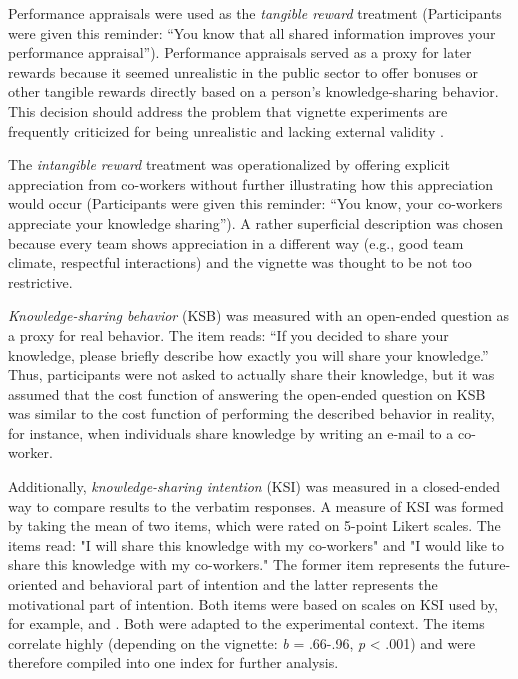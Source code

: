\documentclass{article}
\begin{document}
Performance appraisals were used as the \emph{tangible reward }treatment (Participants were given this reminder: “You know that all shared information improves your performance appraisal”). Performance appraisals served as a proxy for later rewards because it seemed unrealistic in the public sector to offer bonuses or other tangible rewards directly based on a person's knowledge-sharing behavior. This decision should address the problem that vignette experiments are frequently criticized for being unrealistic and lacking external validity \parencite[pp. 361][]{Aguinis2014}.

The \emph{intangible reward} treatment was operationalized by offering explicit appreciation from co-workers without further illustrating how this appreciation would occur (Participants were given this reminder: “You know, your co-workers appreciate your knowledge sharing”). A rather superficial description was chosen because every team shows appreciation in a different way (e.g., good team climate, respectful interactions) and the vignette was thought to be not too restrictive.

\emph{Knowledge-sharing behavior} (KSB) was measured with an open-ended question as a proxy for real behavior. The item reads: “If you decided to share your knowledge, please briefly describe how exactly you will share your knowledge.” Thus, participants were not asked to actually share their knowledge, but it was assumed that the cost function of answering the open-ended question on KSB was similar to the cost function of performing the described behavior in reality, for instance, when individuals share knowledge by writing an e-mail to a co-worker. 

Additionally, \emph{knowledge-sharing intention} (KSI) was measured in a closed-ended way to compare results to the verbatim responses. A measure of KSI was formed by taking the mean of two items, which were rated on 5-point Likert scales. The items read: "I will share this knowledge with my co-workers" and "I would like to share this knowledge with my co-workers." The former item represents the future-oriented and behavioral part of intention and the latter represents the motivational part of intention. Both items were based on scales on KSI used by, for example, \textcite{Bock2002} and \textcite{Lin2007}. Both were adapted to the experimental context. The items correlate highly (depending on the vignette: \emph{b }= .66-.96, \emph{p} < .001) and were therefore compiled into one index for further analysis. 
\end{document}

